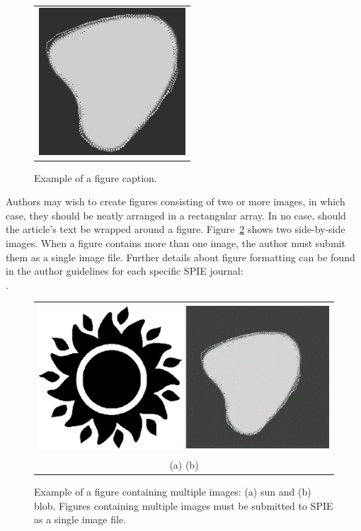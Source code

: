 \documentclass[12pt]{spieman}  %
\begin{document}
\begin{spacing}{2}
\begin{figure}
\begin{center}
\begin{tabular}{c}
\includegraphics[height=5.5cm]{mcr3b.eps}
\end{tabular}
\end{center}
\caption
{ \label{fig:example}
Example of a figure caption. }
\end{figure}

Authors may wish to create figures consisting of two or more images, in which case, they should be neatly arranged in a rectangular array.  In no case, should the article's text be wrapped around a figure. Figure~\ref{fig:example2} shows two side-by-side images. When a figure contains more than one image, the author must submit them as a single image file. Further details about figure formatting can be found in the author guidelines for each specific SPIE journal: \\
.

\begin{figure}
\begin{center}
\begin{tabular}{c}
\includegraphics[height=5.5cm]{fig2.eps}  %
\\
(a) \hspace{5.1cm} (b)
\end{tabular}
\end{center}
\caption
{ \label{fig:example2}
Example of a figure containing multiple images: (a) sun and (b) blob. Figures containing multiple images must be submitted to SPIE as a single image file.}
\end{figure}


\end{spacing}
\end{document}
